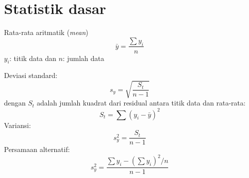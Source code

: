 \section{Statistik dasar}
Rata-rata aritmatik (\textit{mean})
\begin{equation}
\bar{y} = \dfrac{\sum y_i}{n}
\end{equation}
$y_i$: titik data dan $n$: jumlah data

Deviasi standard:
\begin{equation}
s_{y} = \sqrt{\frac{S_t}{n-1}}
\end{equation}
dengan $S_t$ adalah jumlah kuadrat dari residual antara titik data dan rata-rata:
\begin{equation}
S_t = \sum \left( y_i - \bar{y} \right)^2
\end{equation}
Variansi:
\begin{equation}
s^{2}_{y} = \frac{S_t}{n - 1} 
\end{equation}
Persamaan alternatif:
\begin{equation}
s^{2}_{y} = \frac{\sum y_i - \left( \sum y_i \right)^2 / n}{n - 1}
\end{equation}
